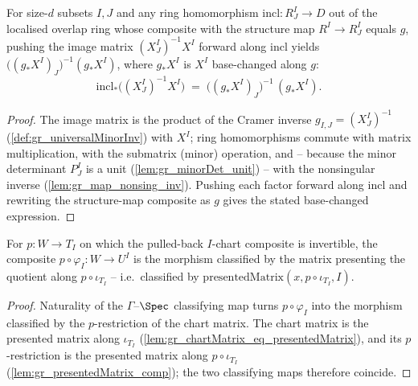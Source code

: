 \begin{lemma}
  \label{lem:gr_imageMatrix_map_ringHom}
  For size-\(d\) subsets \(I, J\) and any ring homomorphism
  \(\mathrm{incl} : R^I_J \to D\) out of the localised overlap ring whose composite with
  the structure map \(R^I \to R^I_J\) equals \(g\), pushing the image matrix
  \((X^I_J)^{-1} X^I\) forward along \(\mathrm{incl}\) yields \(\bigl((g_{*}X^I)_J\bigr)^{-1}
  (g_{*}X^I)\), where \(g_{*}X^I\) is \(X^I\) base-changed along \(g\):
  \[
    \mathrm{incl}_{*}\bigl((X^I_J)^{-1} X^I\bigr)
      \;=\; \bigl((g_{*}X^I)_J\bigr)^{-1}\, (g_{*}X^I).
  \]
\end{lemma}
\begin{proof}
  The image matrix is the product of the Cramer inverse \(g_{I,J} = (X^I_J)^{-1}\)
  (\cref{def:gr_universalMinorInv}) with \(X^I\); ring homomorphisms commute with matrix
  multiplication, with the submatrix (minor) operation, and -- because the minor
  determinant \(P^I_J\) is a unit (\cref{lem:gr_minorDet_unit}) -- with the nonsingular
  inverse (\cref{lem:gr_map_nonsing_inv}). Pushing each factor forward along
  \(\mathrm{incl}\) and rewriting the structure-map composite as \(g\) gives the stated
  base-changed expression.
\end{proof}

\begin{lemma}
  \label{lem:gr_comp_chartMorphism}
  For \(p : W \to T_I\) on which the pulled-back \(I\)-chart composite is invertible, the
  composite \(p \circ \varphi_I : W \to U^I\) is the morphism classified by the matrix
  presenting the quotient along \(p \circ \iota_{T_I}\) -- i.e.\ classified by
  \(\mathrm{presentedMatrix}(x, p \circ \iota_{T_I}, I)\).
\end{lemma}
\begin{proof}
  Naturality of the \(\Gamma\)--\(\Spec\) classifying map turns \(p \circ \varphi_I\) into
  the morphism classified by the \(p\)-restriction of the chart matrix. The chart matrix is
  the presented matrix along \(\iota_{T_I}\) (\cref{lem:gr_chartMatrix_eq_presentedMatrix}),
  and its \(p\)-restriction is the presented matrix along \(p \circ \iota_{T_I}\)
  (\cref{lem:gr_presentedMatrix_comp}); the two classifying maps therefore coincide.
\end{proof}

